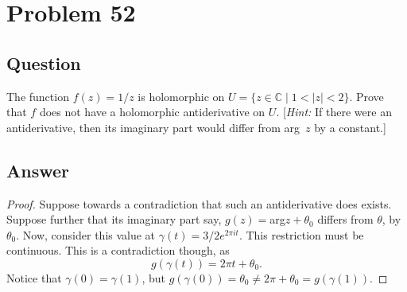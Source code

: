 \documentclass[11pt]{article}
\begin{document}
\section{Problem  52}
\subsection{Question}
The function $f(z) =1 /z$ is holomorphic on $U = \{z \in \mathbb{C} \mid 1 < |z| <2 \}$. Prove that $f$ does not have a holomorphic antiderivative on $U$. [\emph{Hint:} If there were an antiderivative, then its imaginary part would differ from arg~$z$ by a constant.]
\subsection{Answer}
\begin{proof}
Suppose towards a contradiction that such an antiderivative does exists. Suppose further that its imaginary part say, $g(z) =$arg$z+ \theta_0$ differs from $\theta$, by $\theta_0$. Now, consider this value at $\gamma(t) = 3/2e^{2 \pi i t }$. This restriction must be continuous. This is a contradiction though, as 
\[g(\gamma(t)) = 2\pi t + \theta_0.\]
Notice that $\gamma(0) =\gamma(1)$, but $g(\gamma(0)) = \theta_0 \neq 2\pi+ \theta_0 = g(\gamma(1))$.
\end{proof}
\end{document}
